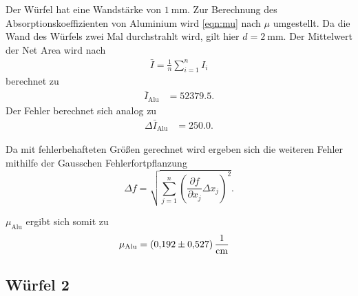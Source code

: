 Der Würfel hat eine Wandstärke von $\qty{1}{\milli\meter}$.
Zur Berechnung des Absorptionskoeffizienten von Aluminium wird \autoref{eqn:mu} nach $\mu$ umgestellt.
Da die Wand des Würfels zwei Mal durchstrahlt wird, gilt hier $d=\qty{2}{\milli\meter}$.
Der Mittelwert der Net Area wird nach 
\begin{align*}
  \bar{I}=\frac{1}{n} \sum_{i=1}^n I_i \label{eqn:Mittelwert}
\end{align*}
berechnet zu 
\begin{align*}
  \bar{I}_{\text{Alu}} &=  52379.5.
\end{align*}
Der Fehler berechnet sich analog zu
\begin{align*}
  \Delta \bar{I}_{\text{Alu}} &=  250.0.
\end{align*}

Da mit fehlerbehafteten Größen gerechnet wird ergeben sich die weiteren Fehler mithilfe der Gausschen Fehlerfortpflanzung
\begin{equation*}
  \Delta f=\sqrt{\sum_{j=1}^n \left(\frac{\partial f}{\partial x_j}\Delta x_j \right)^{2}}.\label{eqn:Gauß}
\end{equation*}

$\mu_{\text{Alu}}$ ergibt sich somit zu 
\begin{align*}
  \mu_{\text{Alu}} &= \qty{0.192 \pm 0.527}{\per\centi\meter}
\end{align*}


\subsection{Würfel 2}
\label{sub:2}

